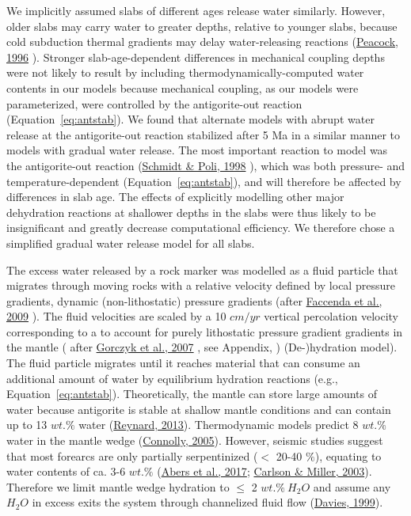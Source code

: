 \documentclass[draft,linenumbers]{agujournal2018}
\providecommand{\DIFaddtex}[1]{{\protect\color{blue} \sf #1}} %
\providecommand{\DIFdeltex}[1]{{\protect\color{red} \scriptsize #1}} %
\providecommand{\DIFaddbegin}{} %
\providecommand{\DIFaddend}{} %
\providecommand{\DIFdelbegin}{} %
\providecommand{\DIFdelend}{} %
\providecommand{\DIFadd}[1]{\texorpdfstring{\DIFaddtex{#1}}{#1}} %
\providecommand{\DIFdel}[1]{\texorpdfstring{\DIFdeltex{#1}}{}} %
\begin{document}
\DIFaddbegin \DIFadd{We implicitly assumed slabs of different ages release water similarly.
However, older slabs may carry water to greater depths, relative to
younger slabs, because cold subduction thermal gradients may delay
water-releasing reactions (}\protect\hyperlink{ref-Peacock1996}{Peacock,
1996}\DIFadd{). Stronger slab-age-dependent differences in mechanical coupling
depths were not likely to result by including thermodynamically-computed
water contents in our models because mechanical coupling, as our models
were parameterized, were controlled by the antigorite-out reaction
(Equation~\ref{eq:antstab}). We found that alternate models with abrupt
water release at the antigorite-out reaction stabilized after 5 Ma in a
similar manner to models with gradual water release. The most important
reaction to model was the antigorite-out reaction
(}\protect\hyperlink{ref-Schmidt1998}{Schmidt \& Poli, 1998}\DIFadd{), which was
both pressure- and temperature-dependent (Equation~\ref{eq:antstab}),
and will therefore be affected by differences in slab age. The effects
of explicitly modelling other major dehydration reactions at shallower
depths in the slabs were thus likely to be insignificant and greatly
decrease computational efficiency. We therefore chose a simplified
gradual water release model for all slabs.
}

\DIFaddend The excess water released by a rock marker was modelled as a fluid
particle that migrates through moving rocks with a relative velocity
defined by local \DIFdelbegin \DIFdel{pressure gradients, }\DIFdelend \DIFaddbegin \DIFadd{dynamic (non-lithostatic) pressure gradients (after
}\protect\hyperlink{ref-Faccenda2009}{Faccenda et al., 2009}\DIFadd{). The fluid
velocities are }\DIFaddend scaled by a 10 \(cm/yr\) vertical percolation velocity \DIFdelbegin \DIFdel{corresponding to
a }\DIFdelend \DIFaddbegin \DIFadd{to
account for }\DIFaddend purely lithostatic pressure \DIFdelbegin \DIFdel{gradient }\DIFdelend \DIFaddbegin \DIFadd{gradients }\DIFaddend in the mantle (\DIFaddbegin \DIFadd{after
}\protect\hyperlink{ref-Gorczyk2007}{Gorczyk et al., 2007}\DIFadd{, }\DIFaddend see Appendix,
\DIFdelbegin %
\DIFdel{)}\DIFdelend \DIFaddbegin \DIFadd{(De-)hydration model)}\DIFaddend . The fluid particle migrates until it reaches
material that can consume an additional amount of water by equilibrium
hydration reactions (e.g., Equation~\ref{eq:antstab}). Theoretically,
the mantle can store large amounts of water because antigorite is stable
at shallow mantle conditions and can contain up to 13 \(wt.\%\) water
(\protect\hyperlink{ref-Reynard2013}{Reynard, 2013}). Thermodynamic
models predict 8 \(wt.\%\) water in the mantle wedge
(\protect\hyperlink{ref-Connolly2005}{Connolly, 2005}). However, seismic
studies suggest that most forearcs are only partially serpentinized
(\(<\) 20-40 \(\%\)), equating to water contents of ca. 3-6 \(wt.\%\)
(\protect\hyperlink{ref-Abers2017}{Abers et al., 2017};
\protect\hyperlink{ref-Carlson2003}{Carlson \& Miller, 2003}). Therefore
we limit mantle wedge hydration to \(\leq\) 2 \(wt.\%\ H_{2}O\) and
assume any \(H_{2}O\) in excess exits the system through channelized
fluid flow (\protect\hyperlink{ref-Davies1999}{Davies, 1999}).
\end{document}
